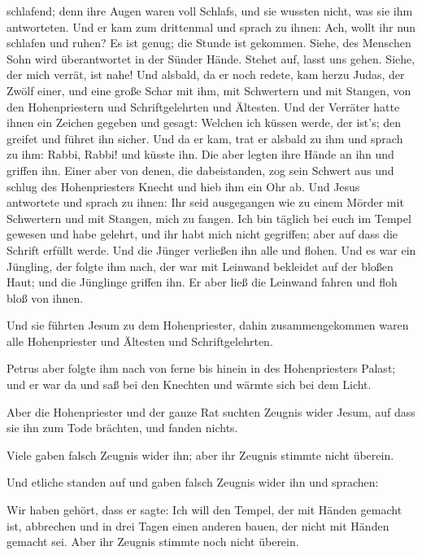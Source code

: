 schlafend; denn ihre Augen waren voll Schlafs, und sie wussten nicht,
was sie ihm antworteten.  Und er kam zum drittenmal und
sprach zu ihnen: Ach, wollt ihr nun schlafen und ruhen? Es ist genug;
die Stunde ist gekommen. Siehe, des Menschen Sohn wird überantwortet in
der Sünder Hände.  Stehet auf, lasst uns gehen. Siehe,
der mich verrät, ist nahe!  Und alsbald, da er noch
redete, kam herzu Judas, der Zwölf einer, und eine große Schar mit ihm,
mit Schwertern und mit Stangen, von den Hohenpriestern und
Schriftgelehrten und Ältesten.  Und der Verräter hatte
ihnen ein Zeichen gegeben und gesagt: Welchen ich küssen werde, der
ist's; den greifet und führet ihn sicher.  Und da er kam,
trat er alsbald zu ihm und sprach zu ihm: Rabbi, Rabbi! und küsste ihn.
 Die aber legten ihre Hände an ihn und griffen ihn.
 Einer aber von denen, die dabeistanden, zog sein Schwert
aus und schlug des Hohenpriesters Knecht und hieb ihm ein Ohr ab.
 Und Jesus antwortete und sprach zu ihnen: Ihr seid
ausgegangen wie zu einem Mörder mit Schwertern und mit Stangen, mich zu
fangen.  Ich bin täglich bei euch im Tempel gewesen und
habe gelehrt, und ihr habt mich nicht gegriffen; aber auf dass die
Schrift erfüllt werde.  Und die Jünger verließen ihn alle
und flohen.  Und es war ein Jüngling, der folgte ihm
nach, der war mit Leinwand bekleidet auf der bloßen Haut; und die
Jünglinge griffen ihn.  Er aber ließ die Leinwand fahren
und floh bloß von ihnen.

 Und sie führten Jesum zu dem Hohenpriester, dahin
zusammengekommen waren alle Hohenpriester und Ältesten und
Schriftgelehrten.

 Petrus aber folgte ihm nach von ferne bis hinein in des
Hohenpriesters Palast; und er war da und saß bei den Knechten und wärmte
sich bei dem Licht.

 Aber die Hohenpriester und der ganze Rat suchten Zeugnis
wider Jesum, auf dass sie ihn zum Tode brächten, und fanden nichts.

 Viele gaben falsch Zeugnis wider ihn; aber ihr Zeugnis
stimmte nicht überein.

 Und etliche standen auf und gaben falsch Zeugnis wider
ihn und sprachen:

 Wir haben gehört, dass er sagte: Ich will den Tempel,
der mit Händen gemacht ist, abbrechen und in drei Tagen einen anderen
bauen, der nicht mit Händen gemacht sei.  Aber ihr
Zeugnis stimmte noch nicht überein.

